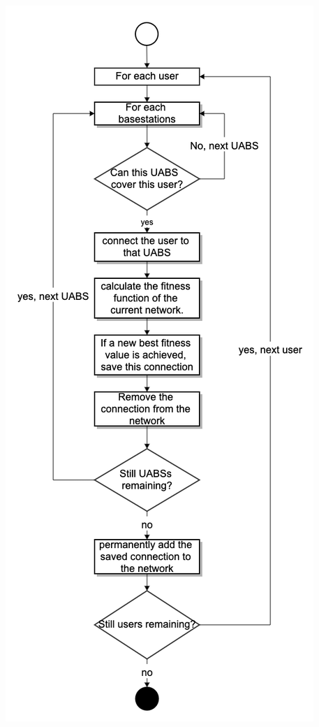 \noindent
\begin{minipage}{0.6\textwidth}%
  \includegraphics[width=\textwidth]{../images/decisionAlgoFlowChart.png}
  \label{fig:decisionAlgoFlowChart}
\end{minipage}%
